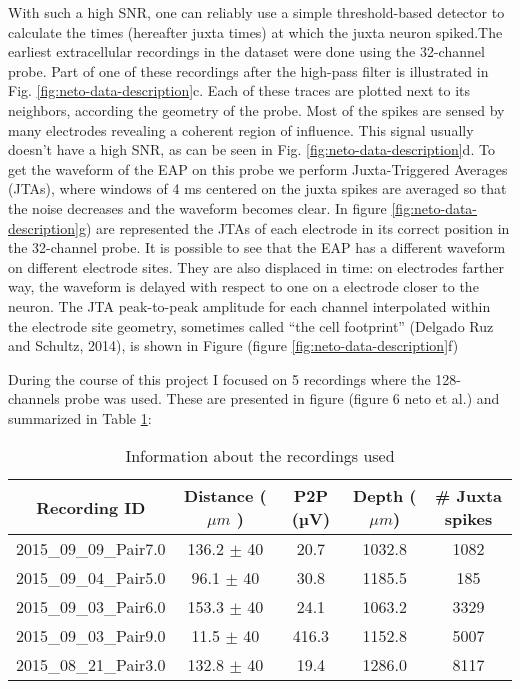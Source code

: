 \documentclass{report}
\begin{document}
With such a high SNR, one can reliably use a simple threshold-based detector to calculate the times (hereafter juxta times) at which the juxta neuron spiked.The earliest extracellular recordings in the dataset were done using the 32-channel probe. Part of one of these recordings after the high-pass filter is illustrated in Fig. \ref{fig:neto-data-description}c.  Each of these traces are plotted next to its neighbors, according the geometry of the probe. Most of the spikes are sensed by many electrodes revealing a coherent region of influence. This signal usually doesn't have a high SNR, as can be seen in Fig. \ref{fig:neto-data-description}d. To get the waveform of the EAP on this probe we perform Juxta-Triggered Averages (JTAs), where windows of 4 ms centered on the juxta spikes are averaged so that the noise decreases and the waveform becomes clear. In figure \ref{fig:neto-data-description}g) are represented the JTAs of each electrode in its correct position in the 32-channel probe. It is possible to see that the EAP has a different waveform on different electrode sites. They are also displaced in time: on electrodes farther way, the waveform is delayed with respect to one on a electrode closer to the neuron. The JTA peak-to-peak amplitude for each channel interpolated within the electrode site geometry, sometimes called “the cell footprint” (Delgado Ruz and Schultz, 2014), is shown in Figure (figure \ref{fig:neto-data-description}f)

During the course of this project I focused on 5 recordings where the 128-channels probe was used. These are presented in figure (figure 6 neto et al.) and summarized in Table \ref{tab:sum-recordings}:
\begin{table}[t]
\centering
\begin{tabular}{|c|c|c|c|c|}
\hline
\textbf{Recording ID} & \textbf{Distance ( $\mu m$ ) } & \textbf{P2P (µV)} & \textbf{Depth ($\mu m$)} & \textbf{\# Juxta spikes}\\ \hline
2015\_09\_09\_Pair7.0 & 136.2 $\pm$ 40 & 20.7 & 1032.8 & 1082  \\ \hline
2015\_09\_04\_Pair5.0 & 96.1 $\pm$ 40 & 30.8 & 1185.5 & 185  \\ \hline
2015\_09\_03\_Pair6.0 & 153.3 $\pm$  40 & 24.1 & 1063.2 & 3329 \\ \hline
2015\_09\_03\_Pair9.0 & 11.5 $\pm$  40 & 416.3 & 1152.8 & 5007  \\ \hline
2015\_08\_21\_Pair3.0 & 132.8 $\pm$ 40 & 19.4 & 1286.0 & 8117 \\ \hline
\end{tabular}
\caption{Information about the recordings used}
\label{tab:sum-recordings}
\end{table}
\end{document}
